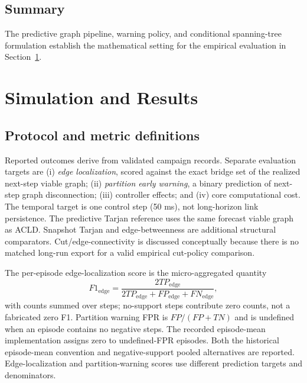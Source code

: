 \documentclass[preprint,12pt]{elsarticle}
\theoremstyle{definition}\newtheorem{definition}{Definition}
\theoremstyle{plain}\newtheorem{theorem}{Theorem}
\theoremstyle{plain}\newtheorem{lemma}{Lemma}
\theoremstyle{plain}\newtheorem{corollary}{Corollary}
\theoremstyle{plain}\newtheorem{assumption}{Assumption}
\theoremstyle{remark}\newtheorem{remark}[theorem]{Remark}
\begin{document}

\subsection{Summary}
\label{subsec:summary}
The predictive graph pipeline, warning policy, and conditional spanning-tree formulation establish the mathematical setting for the empirical evaluation in Section~\ref{sec:simulation}.

\section{Simulation and Results}
\label{sec:simulation}

\subsection{Protocol and metric definitions}
\label{subsec:baselines_metrics}
Reported outcomes derive from validated campaign records. Separate evaluation targets are (i) \emph{edge localization}, scored against the exact bridge set of the realized next-step viable graph; (ii) \emph{partition early warning}, a binary prediction of next-step graph disconnection; (iii) controller effects; and (iv) core computational cost. The temporal target is one control step (50 ms), not long-horizon link persistence. The predictive Tarjan reference uses the same forecast viable graph as ACLD. Snapshot Tarjan and edge-betweenness are additional structural comparators. Cut/edge-connectivity is discussed conceptually because there is no matched long-run export for a valid empirical cut-policy comparison.

The per-episode edge-localization score is the micro-aggregated quantity
\begin{equation}
 F1_{\mathrm{edge}}=\frac{2TP_{\mathrm{edge}}}{2TP_{\mathrm{edge}}+FP_{\mathrm{edge}}+FN_{\mathrm{edge}}},
\end{equation}
with counts summed over steps; no-support steps contribute zero counts, not a fabricated zero F1. Partition warning FPR is $FP/(FP+TN)$ and is undefined when an episode contains no negative steps. The recorded episode-mean implementation assigns zero to undefined-FPR episodes. Both the historical episode-mean convention and negative-support pooled alternatives are reported. Edge-localization and partition-warning scores use different prediction targets and denominators.
\end{document}
